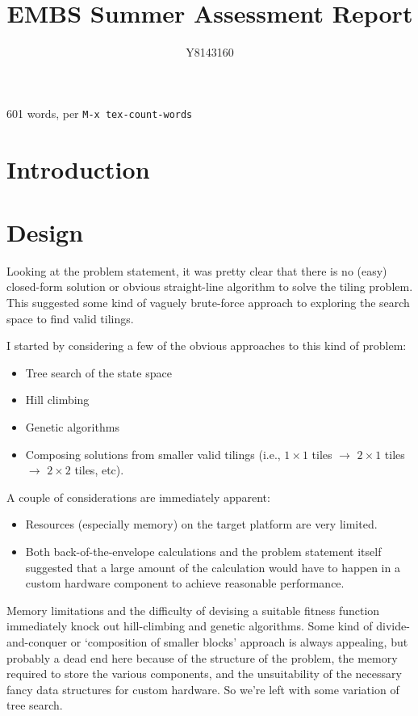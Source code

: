 \documentclass[a4paper,12pt]{article}
\title{EMBS Summer Assessment Report}
\author{Y8143160}
\begin{document}
\maketitle

\begin{center}
  601 words, per \texttt{M-x tex-count-words}
\end{center}

\section{Introduction}

\section{Design}

Looking at the problem statement, it was pretty clear that there is no
(easy) closed-form solution or obvious straight-line algorithm to
solve the tiling problem. This suggested some kind of vaguely
brute-force approach to exploring the search space to find valid
tilings.

I started by considering a few of the obvious approaches to this kind
of problem:

\begin{itemize}
\item Tree search of the state space
\item Hill climbing
\item Genetic algorithms
\item Composing solutions from smaller valid tilings (i.e., $1 \times
  1$ tiles $\rightarrow$ $2 \times 1$ tiles $\rightarrow$ $2 \times 2$
  tiles, etc).
\end{itemize}

A couple of considerations are immediately apparent:

\begin{itemize}
\item Resources (especially memory) on the target platform are very
  limited.
\item Both back-of-the-envelope calculations and the problem statement
  itself suggested that a large amount of the calculation would have
  to happen in a custom hardware component to achieve reasonable
  performance.
\end{itemize}

Memory limitations and the difficulty of devising a suitable fitness
function immediately knock out hill-climbing and genetic
algorithms. Some kind of divide-and-conquer or `composition of smaller
blocks' approach is always appealing, but probably a dead end here
because of the structure of the problem, the memory required to store
the various components, and the unsuitability of the necessary fancy
data structures for custom hardware. So we're left with some variation
of tree search.
\end{document}
